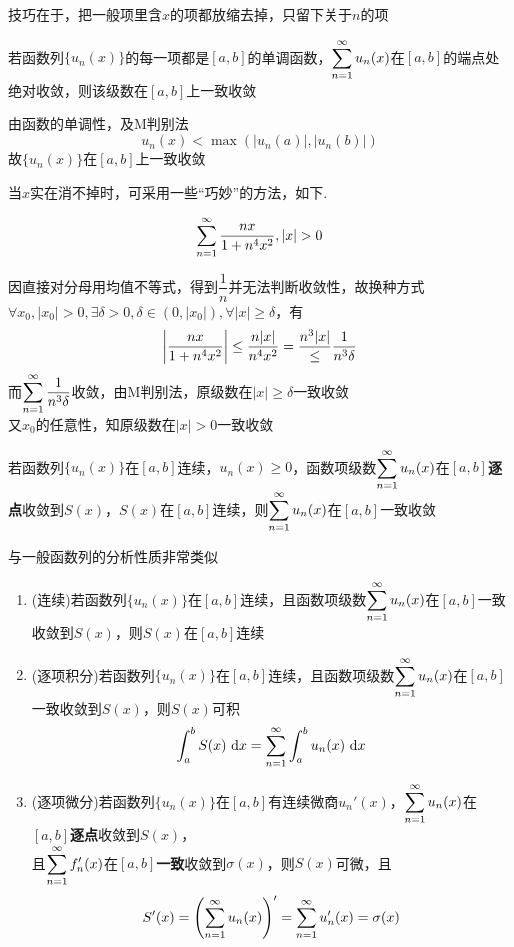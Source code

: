 \par 技巧在于，把一般项里含$x$的项都放缩去掉，只留下关于$n$的项
\begin{example}
若函数列$\{u_n(x)\}$的每一项都是$[a,b]$的单调函数，$\displaystyle\sum_{n=1}^{\infty}u_n(x)$在$[a,b]$的端点处绝对收敛，则该级数在$[a,b]$上一致收敛
\end{example}
\begin{analysis}由函数的单调性，及M判别法
\[u_n(x)<\max(|u_n(a)|,|u_n(b)|)\]
故$\{u_n(x)\}$在$[a,b]$上一致收敛
\end{analysis}
\par 当$x$实在消不掉时，可采用一些“巧妙”的方法，如下.
\begin{example}
\[\ssum{\dfrac{nx}{1+n^4x^2}},|x|>0\]
\end{example}
\begin{analysis}
因直接对分母用均值不等式，得到$\dfrac{1}{n}$并无法判断收敛性，故换种方式\\
$\forall x_0,|x_0|>0,\exists\delta>0,\delta\in(0,|x_0|),\forall|x|\geq\delta$，有
\[\left|\dfrac{nx}{1+n^4x^2}\right|\leq\dfrac{n|x|}{n^4x^2}=\dfrac{n^3|x|}\leq\dfrac{1}{n^3\delta}\]
而$\displaystyle\sum_{n=1}^{\infty}\dfrac{1}{n^3\delta}$收敛，由M判别法，原级数在$|x|\geq\delta$一致收敛\\
又$x_0$的任意性，知原级数在$|x|>0$一致收敛
\end{analysis}
\begin{theorem}[迪尼(Dini)]
若函数列$\{u_n(x)\}$在$[a,b]$连续，$u_n(x)\geq 0$，函数项级数$\displaystyle\sum_{n=1}^{\infty}u_n(x)$在$[a,b]$\textbf{逐点}收敛到$S(x)$，$S(x)$在$[a,b]$连续，则$\displaystyle\sum_{n=1}^{\infty}u_n(x)$在$[a,b]$一致收敛
\end{theorem}
\begin{theorem}[和函数的分析性质]
与一般函数列的分析性质非常类似
\begin{enumerate}
	\item (连续)若函数列$\{u_n(x)\}$在$[a,b]$连续，且函数项级数$\displaystyle\sum_{n=1}^{\infty}u_n(x)$在$[a,b]$一致收敛到$S(x)$，则$S(x)$在$[a,b]$连续
	\item (逐项积分)若函数列$\{u_n(x)\}$在$[a,b]$连续，且函数项级数$\displaystyle\sum_{n=1}^{\infty}u_n(x)$在$[a,b]$一致收敛到$S(x)$，则$S(x)$可积
	\[\displaystyle\int_{a}^{b}{S(x)}\,\,\mathrm{d} x=\displaystyle\sum_{n=1}^{\infty}\displaystyle\int_{a}^{b}{u_n(x)}\,\,\mathrm{d} x\]
	\item (逐项微分)若函数列$\{u_n(x)\}$在$[a,b]$有连续微商$u_n'(x)$，$\displaystyle\sum_{n=1}^{\infty}u_n(x)$在$[a,b]$\textbf{逐点}收敛到$S(x)$，\\
	且$\displaystyle\sum_{n=1}^{\infty}f_n'(x)$在$[a,b]$\textbf{一致}收敛到$\sigma(x)$，则$S(x)$可微，且
	\[\displaystyle S'(x)=\left(\displaystyle\sum_{n=1}^{\infty}u_n(x)\right)'=\displaystyle\sum_{n=1}^{\infty}u_n'(x)=\sigma(x)\]
\end{enumerate}
\end{theorem}

